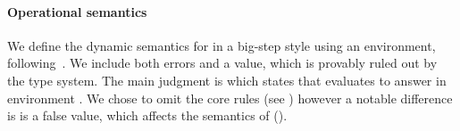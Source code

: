 \paragraph{Operational semantics} We define the dynamic semantics for \lambdatc{}
in a big-step style using an environment, following~\cite{TF10}.
We include both errors and a \wrong{} value, which is provably ruled out by the
type system.
The main judgment is 
which states that \e{} evaluates to answer  in environment
\openv{}. We chose to omit the core rules (see )
however a notable difference is \nil{} is a false value, which affects the
semantics of \ifliteral{} ().


%
%
%

